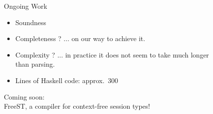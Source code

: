 \documentclass[10pt]{beamer}
\begin{document}
\begin{frame} {Ongoing Work}
	\begin{itemize}
		\item Soundness {\color{olive}\checkmark}
		\item Completeness {\color{orange}?} {\color{gray} ... on our way to achieve it.}
		\item Complexity {\color{orange}?} {\color{gray} ... in practice it does not seem to take much longer \\\hspace*{2.4cm} than parsing.}
		\item Lines of Haskell code: approx.\ $300$
	\end{itemize}
	
	{\color{teal}Coming soon: }\\\smallskip
	\textsf{FreeST}, a compiler for context-free session types!\\
\end{frame}

\end{document}

